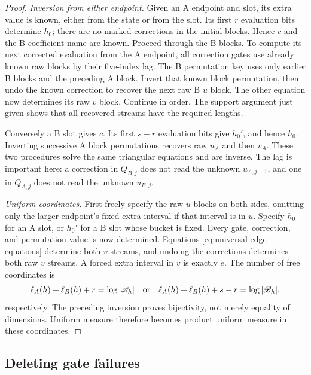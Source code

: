 \begin{proof}
\emph{Inversion from either endpoint.}
Given an A endpoint and slot, its extra value is known, either from the
state or from the slot.  Its first $r$ evaluation bits determine $h_0$;
there are no marked corrections in the initial blocks.  Hence $c$ and
the B coefficient name are known.  Proceed through the B blocks.  To
compute its next corrected evaluation from the A endpoint, all correction
gates use already known raw blocks by their five-index lag.  The B
permutation key uses only earlier B blocks and the preceding A block.
Invert that known block permutation, then undo the known correction to
recover the next raw B $u$ block.  The other equation now determines its
raw $v$ block.  Continue in order.  The support argument just given shows
that all recovered streams have the required lengths.

Conversely a B slot gives $c$.  Its first $s-r$ evaluation bits give
$h_0'$, and hence $h_0$.  Inverting successive A block permutations
recovers raw $u_A$ and then $v_A$.  These two procedures solve the same
triangular equations and are inverse.  The lag is important here: a
correction in $Q_{B,j}$ does not read the unknown $u_{A,j-1}$, and one
in $Q_{A,j}$ does not read the unknown $u_{B,j}$.

\emph{Uniform coordinates.}
First freely specify the raw $u$ blocks on
both sides, omitting only the larger endpoint's fixed extra interval if
that interval is in $u$.  Specify $h_0$ for an A slot, or $h_0'$ for a B
slot whose bucket is fixed.  Every gate, correction, and permutation
value is now determined.  Equations \eqref{eq:universal-edge-equations}
determine both $\bar v$ streams, and undoing the corrections determines
both raw $v$ streams.  A forced extra interval in $v$ is exactly $e$.
The number of free coordinates is
\[
 \ell_A(h)+\ell_B(h)+r=\log|\mathscr A_h|
 \quad\hbox{or}\quad
 \ell_A(h)+\ell_B(h)+s-r=\log|\mathscr B_h|,
\]
respectively.  The preceding inversion proves bijectivity, not merely
equality of dimensions.  Uniform measure therefore becomes product
uniform measure in these coordinates.
\end{proof}

\subsection{Deleting gate failures}

